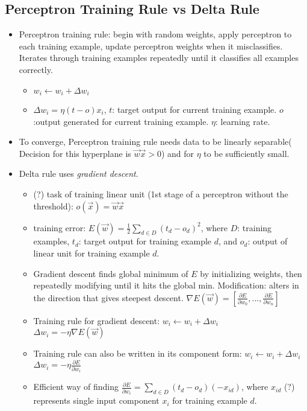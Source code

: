 \documentclass[11pt]{article}
\begin{document}
\subsection{Perceptron Training Rule vs Delta Rule}
\begin{itemize}
\item Perceptron training rule: begin with random weights, apply perceptron to each training example, update perceptron weights when it misclassifies. Iterates through training examples repeatedly until it classifies all examples correctly.
\begin{itemize}
\item $w_i \leftarrow w_i + \Delta w_i$
\item $\Delta w_i=\eta (t-o) x_i$, $t$: target output for current training example. $o$:output generated for current training example. $\eta$: learning rate.
\end{itemize}
\item To converge, Perceptron training rule needs data to be linearly separable( Decision for this hyperplane is $\vec{w}\vec{x} >0$) and for $\eta$ to be sufficiently small.
\item Delta rule uses \textit{gradient descent}.
\begin{itemize}
\item (?) task of training linear unit (1st stage of a perceptron without the threshold): $o(\vec{x}) = \vec{w}\vec{x}$
\item training error: $E(\vec{w})=\frac{1}{2} \sum_{d \in D} (t_d - o_d)^2$, where $D$: training examples, $t_d$: target output for training example $d$, and $o_d$: output of linear unit for training example $d$.
\item Gradient descent finds global minimum of $E$ by initializing weights, then repeatedly modifying until it hits the global min. Modification: alters in the direction that gives steepest descent. $\nabla E(\vec{w})= [\frac{\partial E}{\partial w_0},...,\frac{\partial E}{\partial w_n}]$
\item Training rule for gradient descent: $w_i \leftarrow w_i + \Delta w_i$\\
$\Delta w_i = -\eta \nabla E(\vec{w})$
\item Training rule can also be written in its component form: $w_i \leftarrow w_i+\Delta w_i$\\ $\Delta w_i = -\eta \frac{\partial E}{\partial w_i}$
\item Efficient way of finding $\frac{\partial E}{\partial w_i} = \sum_{d \in D} (t_d-o_d)(-x_{id})$, where $x_{id}$ (?) represents single input component $x_i$ for training example $d$.

\end{itemize}
\end{itemize}
\end{document}
